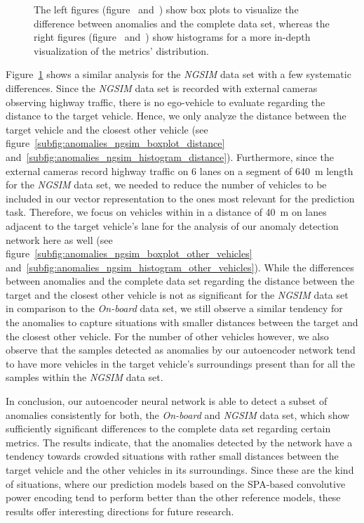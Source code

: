 \begin{figure}[t]
{    The left figures (figure~\protect{} and~\protect{}) show box plots to visualize the difference between anomalies and the complete data set, whereas the right figures (figure~\protect{} and~\protect{}) show histograms for a more in-depth visualization of the metrics' distribution.}
    \label{fig:anomaly_ngsim}
\end{figure}

Figure~\ref{fig:anomaly_ngsim} shows a similar analysis for the \emph{\ac{NGSIM}} data set with a few systematic differences.
Since the \emph{\ac{NGSIM}} data set is recorded with external cameras observing highway traffic, there is no ego-vehicle to evaluate regarding the distance to the target vehicle.
Hence, we only analyze the distance between the target vehicle and the closest other vehicle (see figure~\ref{subfig:anomalies_ngsim_boxplot_distance} and~\ref{subfig:anomalies_ngsim_histogram_distance}).
Furthermore, since the external cameras record highway traffic on \num{6} lanes on a segment of \SI{640}{\meter} length for the \emph{\ac{NGSIM}} data set, we needed to reduce the number of vehicles to be included in our vector representation to the ones most relevant for the prediction task.
Therefore, we focus on vehicles within in a distance of \SI{40}{\meter} on lanes adjacent to the target vehicle's lane for the analysis of our anomaly detection network here as well (see figure~\ref{subfig:anomalies_ngsim_boxplot_other_vehicles} and~\ref{subfig:anomalies_ngsim_histogram_other_vehicles}).
While the differences between anomalies and the complete data set regarding the distance between the target and the closest other vehicle is not as significant for the \emph{\ac{NGSIM}} data set in comparison to the \emph{On-board} data set, we still observe a similar tendency for the anomalies to capture situations with smaller distances between the target and the closest other vehicle.
For the number of other vehicles however, we also observe that the samples detected as anomalies by our autoencoder network tend to have more vehicles in the target vehicle's surroundings present than for all the samples within the \emph{\ac{NGSIM}} data set.

In conclusion, our autoencoder neural network is able to detect a subset of anomalies consistently for both, the \emph{On-board} and \emph{\ac{NGSIM}} data set, which show sufficiently significant differences to the complete data set regarding certain metrics.
The results indicate, that the anomalies detected by the network have a tendency towards crowded situations with rather small distances between the target vehicle and the other vehicles in its surroundings.
Since these are the kind of situations, where our prediction models based on the \ac{SPA}-based convolutive power encoding tend to perform better than the other reference models, these results offer interesting directions for future research.


